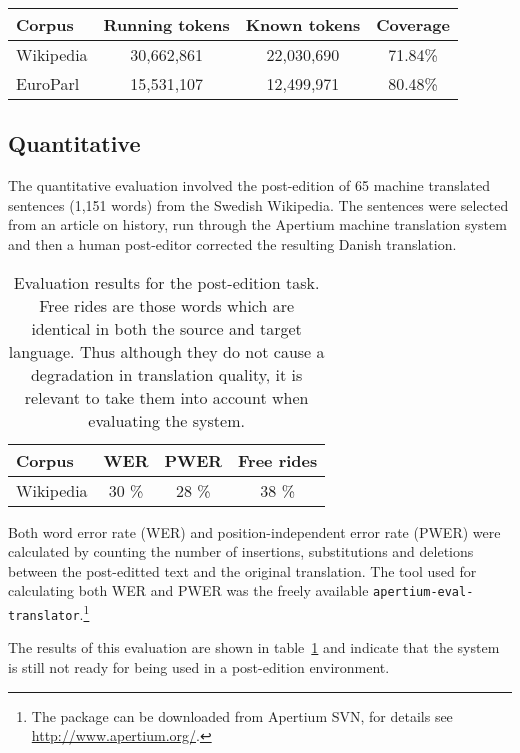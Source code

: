 \documentclass[11pt]{article}
\begin{document}
\begin{table*}
\centering
\begin{tabular}{|l|c|c|c|}
\hline
Corpus & Running tokens & Known tokens & Coverage \\
\hline
Wikipedia  & 30,662,861 & 22,030,690 & 71.84\%\\
EuroParl   & 15,531,107 & 12,499,971 & 80.48\%\\
\hline
\end{tabular}
    \caption{Naïve coverage for two corpora}
    \label{table:coverage}
\end{table*}

\subsection{Quantitative}

The quantitative evaluation involved the post-edition of 65 machine translated
sentences (1,151 words) from the Swedish Wikipedia. The sentences were selected from an 
article on history, run through the Apertium machine translation system and then a human
post-editor corrected the resulting Danish translation.

\begin{table}
\centering
\begin{tabular}{|l|c|c|c|}
\hline
Corpus    & WER & PWER & Free rides\\
\hline
Wikipedia & 30 \% & 28 \%  & 38 \% \\
\hline
\end{tabular}
    \caption{Evaluation results for the post-edition task. Free rides are those words which
       are identical in both the source and target language. Thus although they do not cause
       a degradation in translation quality, it is relevant to take them into account when
       evaluating the system.}
    \label{table:quanteval}
\end{table}

Both word error rate (WER) and position-independent error rate (PWER) were 
calculated by counting the number of insertions, substitutions and deletions
between the post-editted text and the original translation. The tool used for
calculating both WER and PWER was the freely available {\tt\small apertium-eval-translator}.\footnote{The
package can be downloaded from Apertium SVN, for details see {\small \url{http://www.apertium.org/}}.}

The results of this evaluation are shown in table~\ref{table:quanteval} and 
indicate that the system is still not ready for being used in a post-edition 
environment.
\end{document}
